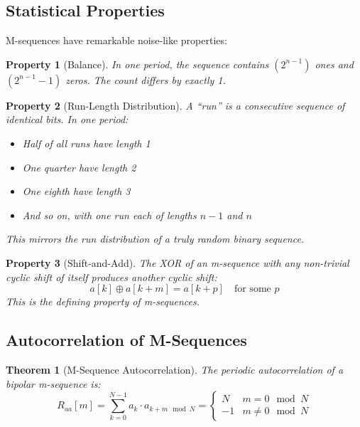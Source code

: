 \documentclass[11pt]{article}
\newtheorem{theorem}{Theorem}
\newtheorem{property}{Property}
\begin{document}
\subsection{Statistical Properties}

M-sequences have remarkable noise-like properties:

\begin{property}[Balance]
In one period, the sequence contains $(2^{n-1})$ ones and $(2^{n-1} - 1)$ zeros. The count differs by exactly 1.
\end{property}

\begin{property}[Run-Length Distribution]
A ``run'' is a consecutive sequence of identical bits. In one period:
\begin{itemize}
    \item Half of all runs have length 1
    \item One quarter have length 2
    \item One eighth have length 3
    \item And so on, with one run each of lengths $n-1$ and $n$
\end{itemize}
This mirrors the run distribution of a truly random binary sequence.
\end{property}

\begin{property}[Shift-and-Add]
The XOR of an m-sequence with any non-trivial cyclic shift of itself produces another cyclic shift:
\begin{equation}
a[k] \oplus a[k + m] = a[k + p] \quad \text{for some } p
\end{equation}
This is the defining property of m-sequences.
\end{property}

\subsection{Autocorrelation of M-Sequences}

\begin{theorem}[M-Sequence Autocorrelation]
The periodic autocorrelation of a bipolar m-sequence is:
\begin{equation}
R_{aa}[m] = \sum_{k=0}^{N-1} a_k \cdot a_{k+m \mod N} = \begin{cases}
N & m = 0 \mod N \\
-1 & m \neq 0 \mod N
\end{cases}
\end{equation}
\end{theorem}
\end{document}
